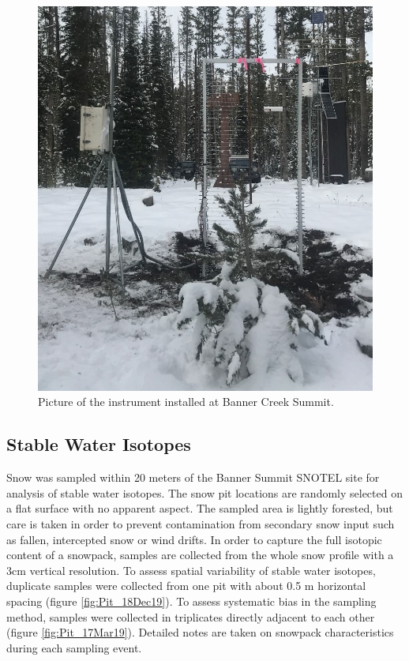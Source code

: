  \begin{figure}[!t]
    \centering
    \includegraphics[width=0.8\linewidth]{figures/Banner_Sensor.jpg}
    \caption{Picture of the instrument installed at Banner Creek Summit.}
    \label{fig:Banner_Sensor}
 \end{figure}

\subsection{Stable Water Isotopes}
Snow was sampled within 20 meters of the Banner Summit SNOTEL site for analysis of stable water isotopes. The snow pit locations are randomly selected on a flat surface with no apparent aspect. The sampled area is lightly forested, but care is taken in order to prevent contamination from secondary snow input such as fallen, intercepted snow or wind drifts. In order to capture the full isotopic content of a snowpack, samples are collected from the whole snow profile with a 3cm vertical resolution. To assess spatial variability of stable water isotopes, duplicate samples were collected from one pit with about 0.5 m horizontal spacing (figure \ref{fig:Pit_18Dec19}). To assess systematic bias in the sampling method, samples were collected in triplicates directly adjacent to each other (figure \ref{fig:Pit_17Mar19}). Detailed notes are taken on snowpack characteristics during each sampling event.

